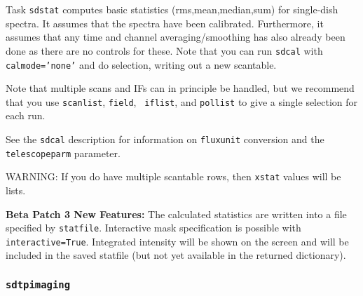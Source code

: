      Task {\tt sdstat} computes basic statistics (rms,mean,median,sum)
     for single-dish spectra.  It assumes that the spectra have
     been calibrated.  Furthermore, it assumes that any
     time and channel averaging/smoothing has also already been done as
     there are no controls for these. Note that you can run {\tt sdcal}
     with {\tt calmode='none'} and do selection, writing out a new
     scantable.

     Note that multiple scans and IFs can in principle be handled, but
     we recommend that you use {\tt scanlist}, {\tt field}, {\tt
     iflist}, and {\tt pollist} to give a single selection for each run.

     See the {\tt sdcal} description for information on {\tt fluxunit} 
     conversion and the {\tt telescopeparm} parameter.

     WARNING: If you do have multiple scantable rows, then {\tt xstat}
     values will be lists.

     {\bf Beta Patch 3 New Features:}
     The calculated statistics are written into a file specified by
     {\tt statfile}.
     Interactive mask specification is possible with {\tt interactive=True}.
     Integrated intensity will be shown on the screen and will be included
     in the saved statfile (but not yet available in the returned dictionary).

\subsubsection{{\tt sdtpimaging}}
\label{section:sd.sdtasks.tasks.sdtpimaging}

